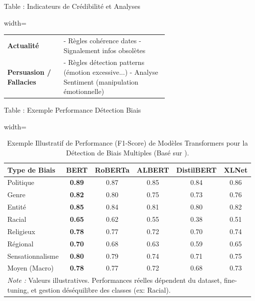 \documentclass[9pt]{beamer}
\begin{document}
\begin{frame}{Table : Indicateurs de Crédibilité et Analyses}
\begin{table}[htbp]
\begin{adjustbox}{width=\textwidth}
\begin{tabular}{@{}lp{0.65\linewidth}@{}}
      \addlinespace
      \textbf{Actualité} \citet{Pescuma2025} & - Règles cohérence dates \newline - Signalement infos obsolètes \\ %
      \addlinespace
      \textbf{Persuasion / Fallacies} \citet{Pescuma2025, Kedzie2018} & - Règles détection patterns (émotion excessive...) \citet{Kedzie2018} \newline - Analyse Sentiment (manipulation émotionnelle) \citet{Ahmed2025Aidriven} \\ %
      \bottomrule
    \end{tabular}
    \end{adjustbox}
  \end{table}
\end{frame}

\begin{frame}{Table : Exemple Performance Détection Biais}
  \begin{table}[htbp]
    \centering
    \caption{Exemple Illustratif de Performance (F1-Score) de Modèles Transformers pour la Détection de Biais Multiples (Basé sur \citet{Shah2024Decoding}).} %
    \label{tab:beamer_bias_detection_perf}
    \tiny
    \begin{adjustbox}{width=\textwidth}
    \begin{tabular}{@{}lccccc@{}}
      \toprule
      Type de Biais & BERT & RoBERTa & ALBERT & DistilBERT & XLNet \\
      \midrule
      Politique & \textbf{0.89} & 0.87 & 0.85 & 0.84 & 0.86 \\
      Genre & \textbf{0.82} & 0.80 & 0.75 & 0.73 & 0.76 \\
      Entité & \textbf{0.85} & 0.84 & 0.81 & 0.80 & 0.82 \\
      Racial & \textbf{0.65} & 0.62 & 0.55 & 0.38 & 0.51 \\
      Religieux & \textbf{0.78} & 0.77 & 0.72 & 0.70 & 0.74 \\
      Régional & \textbf{0.70} & 0.68 & 0.63 & 0.59 & 0.65 \\
      Sensationnalisme & \textbf{0.80} & 0.79 & 0.74 & 0.71 & 0.75 \\
      \midrule
      Moyen (Macro) & \textbf{0.78} & 0.77 & 0.72 & 0.68 & 0.73 \\
      \bottomrule
      \multicolumn{6}{p{0.9\linewidth}}{\textit{Note :} Valeurs illustratives. Performances réelles dépendent du dataset, fine-tuning, et gestion déséquilibre des classes (ex: Racial).} \\
    \end{tabular}
    \end{adjustbox}
  \end{table}
\end{frame}
\end{document}
